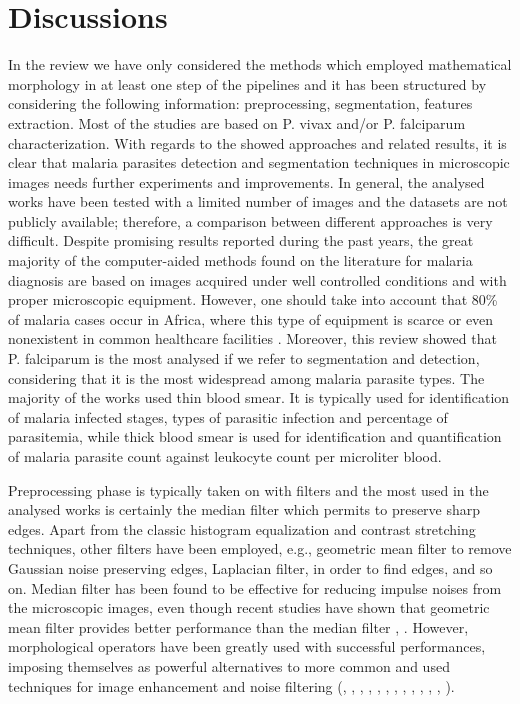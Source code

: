 \documentclass[sensors,review,submit,moreauthors,pdftex,10pt,a4paper]{mdpi}
\begin{document}
\section{Discussions}
In the review we have only considered the methods which employed mathematical morphology in at least one step of the pipelines and it has been structured by considering the following information: preprocessing, segmentation, features extraction.
Most of the studies are based on P. vivax and/or P. falciparum characterization.
With regards to the showed approaches and related results, it is clear that malaria parasites detection and segmentation techniques in microscopic images needs further experiments and improvements. In general, the analysed works have been tested with a limited number of images and the datasets are not publicly available; therefore, a comparison between different approaches is very difficult. Despite promising results reported during the past years, the great majority of the computer-aided methods found on the literature for malaria diagnosis are based on images acquired under well controlled conditions and with proper microscopic equipment. However, one should take into account that 80\% of malaria cases occur in Africa, where this type of equipment is scarce or even nonexistent in common healthcare facilities \cite{Rosado2017}.
Moreover, this review showed that P. falciparum is the most analysed if we refer to segmentation and detection, considering that it is the most widespread among malaria parasite types.
The majority of the works used thin blood smear. It is typically used for identification of malaria infected stages, types of parasitic infection and percentage of parasitemia, while thick blood smear is used for identification and quantification of malaria parasite count against leukocyte count per microliter blood.

Preprocessing phase is typically taken on with filters and the most used in the analysed works is certainly the median filter which permits to preserve sharp edges. Apart from the classic histogram equalization and contrast stretching techniques, other filters have been employed, e.g., geometric mean filter to remove Gaussian noise preserving edges, Laplacian filter, in order to find edges, and so on.
Median filter has been found to be effective for reducing impulse noises from the microscopic images, even though recent studies have shown that geometric mean filter provides better performance than the median filter \cite{Das2013}, \cite{Das2015}. However, morphological operators have been greatly used with successful performances, imposing themselves as powerful alternatives to more common and used techniques for image enhancement and noise filtering (\cite{DiRuberto2002}, \cite{Gonzalez2016}, \cite{Kareem2011}, \cite{Kareem2012}, \cite{Malihi2013}, \cite{Mushabe2013}, \cite{Oliveira2017}, \cite{Reni2015}, \cite{Romero2016}, \cite{Ross2006} \cite{Sheik2013}, \cite{Somasekar2015}, \cite{Springl2009}, \cite{Tek2010}).
\end{document}
